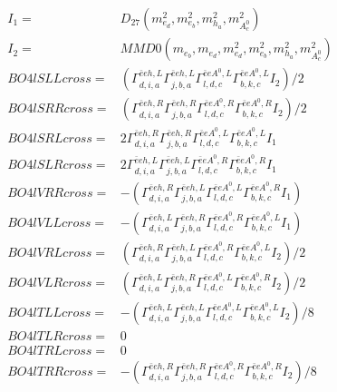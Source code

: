 \documentclass[A4,landscape]{article}
\begin{document}
\begin{align} 
I_1 = & D_{27}(m^2_{e_{{d}}}, m^2_{e_{{b}}}, m^2_{h_{{a}}}, m^2_{A^0_{{c}}}) \\ 
I_2 = & MMD0(m_{e_{{b}}}, m_{e_{{d}}}, m^2_{e_{{d}}}, m^2_{e_{{b}}}, m^2_{h_{{a}}}, m^2_{A^0_{{c}}}) \\ 
  BO4lSLLcross= & ( \Gamma^{\bar{e}e h ,L}_{d, i, a} \Gamma^{\bar{e}e h ,L}_{j, b, a} \Gamma^{\bar{e}e A^0 ,L}_{l, d, c} \Gamma^{\bar{e}e A^0 ,L}_{b, k, c} I_2)/2 \\ 
  BO4lSRRcross= & ( \Gamma^{\bar{e}e h ,R}_{d, i, a} \Gamma^{\bar{e}e h ,R}_{j, b, a} \Gamma^{\bar{e}e A^0 ,R}_{l, d, c} \Gamma^{\bar{e}e A^0 ,R}_{b, k, c} I_2)/2 \\ 
  BO4lSRLcross= & 2  \Gamma^{\bar{e}e h ,R}_{d, i, a} \Gamma^{\bar{e}e h ,R}_{j, b, a} \Gamma^{\bar{e}e A^0 ,L}_{l, d, c} \Gamma^{\bar{e}e A^0 ,L}_{b, k, c} I_1 \\ 
  BO4lSLRcross= & 2  \Gamma^{\bar{e}e h ,L}_{d, i, a} \Gamma^{\bar{e}e h ,L}_{j, b, a} \Gamma^{\bar{e}e A^0 ,R}_{l, d, c} \Gamma^{\bar{e}e A^0 ,R}_{b, k, c} I_1 \\ 
  BO4lVRRcross= & -( \Gamma^{\bar{e}e h ,R}_{d, i, a} \Gamma^{\bar{e}e h ,L}_{j, b, a} \Gamma^{\bar{e}e A^0 ,L}_{l, d, c} \Gamma^{\bar{e}e A^0 ,R}_{b, k, c} I_1) \\ 
  BO4lVLLcross= & -( \Gamma^{\bar{e}e h ,L}_{d, i, a} \Gamma^{\bar{e}e h ,R}_{j, b, a} \Gamma^{\bar{e}e A^0 ,R}_{l, d, c} \Gamma^{\bar{e}e A^0 ,L}_{b, k, c} I_1) \\ 
  BO4lVRLcross= & ( \Gamma^{\bar{e}e h ,R}_{d, i, a} \Gamma^{\bar{e}e h ,L}_{j, b, a} \Gamma^{\bar{e}e A^0 ,R}_{l, d, c} \Gamma^{\bar{e}e A^0 ,L}_{b, k, c} I_2)/2 \\ 
  BO4lVLRcross= & ( \Gamma^{\bar{e}e h ,L}_{d, i, a} \Gamma^{\bar{e}e h ,R}_{j, b, a} \Gamma^{\bar{e}e A^0 ,L}_{l, d, c} \Gamma^{\bar{e}e A^0 ,R}_{b, k, c} I_2)/2 \\ 
  BO4lTLLcross= & -( \Gamma^{\bar{e}e h ,L}_{d, i, a} \Gamma^{\bar{e}e h ,L}_{j, b, a} \Gamma^{\bar{e}e A^0 ,L}_{l, d, c} \Gamma^{\bar{e}e A^0 ,L}_{b, k, c} I_2)/8 \\ 
  BO4lTLRcross= & 0 \\ 
  BO4lTRLcross= & 0 \\ 
  BO4lTRRcross= & -( \Gamma^{\bar{e}e h ,R}_{d, i, a} \Gamma^{\bar{e}e h ,R}_{j, b, a} \Gamma^{\bar{e}e A^0 ,R}_{l, d, c} \Gamma^{\bar{e}e A^0 ,R}_{b, k, c} I_2)/8 \\ 
\end{align} 
\end{document}
